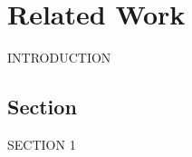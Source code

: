 
\setcounter{chapter}{0}

\chapter{Related Work}
\label{chap:relatedwork}

INTRODUCTION

\section{Section}

SECTION 1